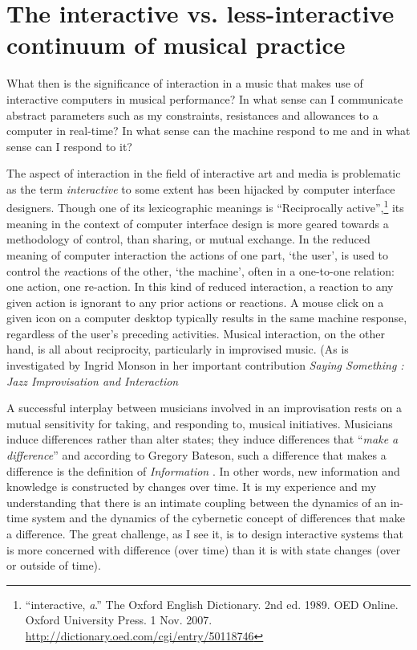 \documentclass{article}
\begin{document}
\section{The interactive vs. less-interactive continuum of musical practice}
\label{sec:interactive-vs.-less}
What then is the significance of interaction in a music that makes use of interactive computers in musical performance? In what sense can I communicate abstract parameters such as my constraints, resistances and allowances to a computer in real-time? In what sense can the machine respond to me and in what sense can I respond to it?

The aspect of interaction in the field of interactive art and media is problematic as the term \emph{interactive} to some extent has been hijacked by computer interface designers. Though one of its lexicographic meanings is ``Reciprocally active'',\footnote{``interactive, \textit{a}.'' The Oxford English Dictionary. 2nd ed. 1989. OED Online. Oxford University Press. 1 Nov. 2007. \url{http://dictionary.oed.com/cgi/entry/50118746}} its meaning in the context of computer interface design is more geared towards a methodology of control, than sharing, or mutual exchange. In the reduced meaning of computer interaction the actions of one part, `the user', is used to control the \emph{re}actions of the other, `the machine', often in a one-to-one relation: one action, one re-action. In this kind of reduced interaction, a reaction to any given action is ignorant to any prior actions or reactions. A mouse click on a given icon on a computer desktop typically results in the same machine response, regardless of the user's preceding activities. Musical interaction, on the other hand, is all about reciprocity, particularly in improvised music. (As is investigated by Ingrid Monson in her important contribution \emph{Saying Something : Jazz Improvisation and Interaction} \citep[][]{monson96} 

A successful interplay between musicians involved in an improvisation rests on a mutual sensitivity for taking, and responding to, musical initiatives. Musicians induce differences rather than alter states; they induce differences that ``\emph{make a difference}'' and according to Gregory Bateson, such a difference that makes a difference is the definition of \emph{Information} \citep[92]{Bateson}. In other words, new information and knowledge is constructed by changes over time. It is my experience and my understanding that there is an intimate coupling between the dynamics of an in-time system and the dynamics of the cybernetic concept of differences that make a difference. The great challenge, as I see it, is to design interactive systems that is more concerned with difference (over time) than it is with state changes (over or outside of time).
\end{document}

